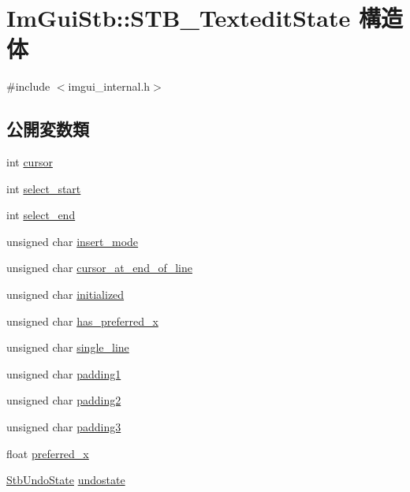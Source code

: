 \hypertarget{struct_im_gui_stb_1_1_s_t_b___textedit_state}{}\section{Im\+Gui\+Stb\+:\+:S\+T\+B\+\_\+\+Textedit\+State 構造体}
\label{struct_im_gui_stb_1_1_s_t_b___textedit_state}


{\ttfamily \#include $<$imgui\+\_\+internal.\+h$>$}

\subsection*{公開変数類}
\begin{DoxyCompactItemize}
\item 
int \mbox{\hyperlink{struct_im_gui_stb_1_1_s_t_b___textedit_state_a8656ac706fba8cc8cbcde46f18437c72}{cursor}}
\item 
int \mbox{\hyperlink{struct_im_gui_stb_1_1_s_t_b___textedit_state_ac3078352e3b28aeb7afcf08f113d9640}{select\+\_\+start}}
\item 
int \mbox{\hyperlink{struct_im_gui_stb_1_1_s_t_b___textedit_state_ab5bcff874696e23964ef779f4d19a07d}{select\+\_\+end}}
\item 
unsigned char \mbox{\hyperlink{struct_im_gui_stb_1_1_s_t_b___textedit_state_a1c918a228338ab3a1c0b640c3d98df93}{insert\+\_\+mode}}
\item 
unsigned char \mbox{\hyperlink{struct_im_gui_stb_1_1_s_t_b___textedit_state_ab4494b7f240ddb36f39ed841b341c7a3}{cursor\+\_\+at\+\_\+end\+\_\+of\+\_\+line}}
\item 
unsigned char \mbox{\hyperlink{struct_im_gui_stb_1_1_s_t_b___textedit_state_a88a83a49d1aecb9270a57bac07527b9b}{initialized}}
\item 
unsigned char \mbox{\hyperlink{struct_im_gui_stb_1_1_s_t_b___textedit_state_ac118037861698c8a0921012799707b68}{has\+\_\+preferred\+\_\+x}}
\item 
unsigned char \mbox{\hyperlink{struct_im_gui_stb_1_1_s_t_b___textedit_state_aa3bde2b0354fbdc2413dbc9a8aaef9c7}{single\+\_\+line}}
\item 
unsigned char \mbox{\hyperlink{struct_im_gui_stb_1_1_s_t_b___textedit_state_abd63300ec47cc0b4cb36e21537d2cc59}{padding1}}
\item 
unsigned char \mbox{\hyperlink{struct_im_gui_stb_1_1_s_t_b___textedit_state_aa6e2882bd1752493ba8acd000d247325}{padding2}}
\item 
unsigned char \mbox{\hyperlink{struct_im_gui_stb_1_1_s_t_b___textedit_state_a3ef1e2f20a9c518a786a0cf51b474828}{padding3}}
\item 
float \mbox{\hyperlink{struct_im_gui_stb_1_1_s_t_b___textedit_state_a69ad8390f04856d8833d2355d299e74a}{preferred\+\_\+x}}
\item 
\mbox{\hyperlink{struct_im_gui_stb_1_1_stb_undo_state}{Stb\+Undo\+State}} \mbox{\hyperlink{struct_im_gui_stb_1_1_s_t_b___textedit_state_aa53b0d0fcbe15632d67f42bc37e6888d}{undostate}}
\end{DoxyCompactItemize}


